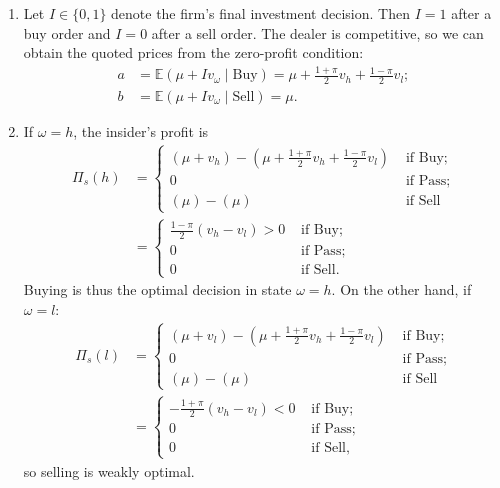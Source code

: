 \begin{solution}
\begin{enumerate}[label=(\alph{enumi})]
		\item 
		Let $I \in \{0,1\}$ denote the firm's final investment decision. Then $I=1$ after a buy order and $I=0$ after a sell order. The dealer is competitive, so we can obtain the quoted prices from the zero-profit condition:
		\begin{align}
			a &= \mathbb{E}(\mu + I v_\omega \mid \text{Buy}) = \mu + \frac{1+\pi}{2} v_h + \frac{1-\pi}{2} v_l;
			\label{eq:fbask}
			\\
			b &= \mathbb{E}(\mu + I v_\omega \mid \text{Sell}) = \mu.
			\label{eq:fbbid}
		\end{align}
		
		\item 
		If $\omega = h$, the insider's profit is
		\begin{align*}
			\Pi_s(h) &= \begin{cases}
				(\mu + v_h) - \left( \mu + \frac{1+\pi}{2} v_h + \frac{1-\pi}{2} v_l \right)
				& \text{ if Buy};
				\\
				0 & \text{ if Pass};
				\\
				(\mu) - (\mu) & \text{ if Sell}
			\end{cases}
			\\
			&=\begin{cases}
				\frac{1-\pi}{2} (v_h - v_l) > 0 & \text{ if Buy};
				\\
				0 & \text{ if Pass};
				\\
				0 & \text{ if Sell}.
			\end{cases}
		\end{align*}
		Buying is thus the optimal decision in state $\omega = h$. On the other hand, if $\omega = l$:
		\begin{align*}
			\Pi_s(l) &= \begin{cases}
				(\mu + v_l) - \left( \mu + \frac{1+\pi}{2} v_h + \frac{1-\pi}{2} v_l \right)
				& \text{ if Buy};
				\\
				0 & \text{ if Pass};
				\\
				(\mu) - (\mu) & \text{ if Sell}
			\end{cases}
			\\
			&=\begin{cases}
				-\frac{1+\pi}{2} (v_h - v_l) < 0 & \text{ if Buy};
				\\
				0 & \text{ if Pass};
				\\
				0 & \text{ if Sell},
			\end{cases}
		\end{align*}
		so selling is weakly optimal. 
		

\end{enumerate}
\end{solution}
